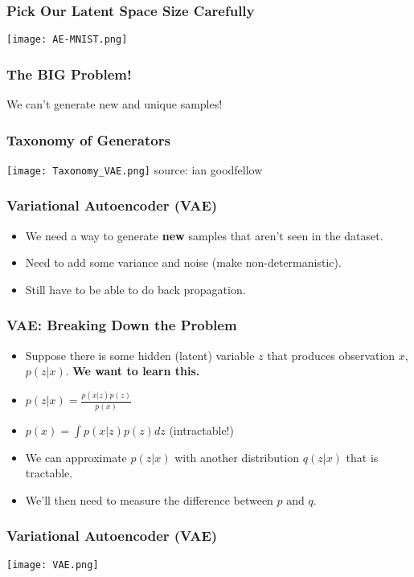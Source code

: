\begin{frame}
    \frametitle{Pick Our Latent Space Size Carefully}
    \texttt{[image: AE-MNIST.png]}
\end{frame}

\begin{frame}
    \frametitle{The BIG Problem!}
    \center We can't generate new and unique samples!
\end{frame}

\begin{frame}
    \frametitle{Taxonomy of Generators}
    \texttt{[image: Taxonomy\_VAE.png]}
    \null\hfill \tiny{source: ian goodfellow}
\end{frame}

\begin{frame}
    \frametitle{Variational Autoencoder (VAE)}
    \begin{itemize}
        \item We need a way to generate \textbf{new} samples that aren't seen in
            the dataset.
        \item Need to add some variance and noise (make non-determanistic).
        \item Still have to be able to do back propagation.
    \end{itemize}
\end{frame}

\begin{frame}
    \frametitle{VAE: Breaking Down the Problem}
    \begin{itemize}
        \item<1-> Suppose there is some hidden (latent) variable $z$ that produces
            observation $x$, $p(z|x)$. \textbf{We want to learn this.}
        \item<2-> $p(z|x) = \frac{p(x|z)p(z)}{p(x)}$
        \item<3-> $p(x) = \int p(x|z)p(z)dz$ (intractable!)
        \item<4-> We can approximate $p(z|x)$ with another distribution $q(z|x)$
            that is tractable.
        \item<5-> We'll then need to measure the difference between $p$ and $q$.
    \end{itemize}
\end{frame}

\begin{frame}
    \frametitle{Variational Autoencoder (VAE)}
    \texttt{[image: VAE.png]}
\end{frame}

